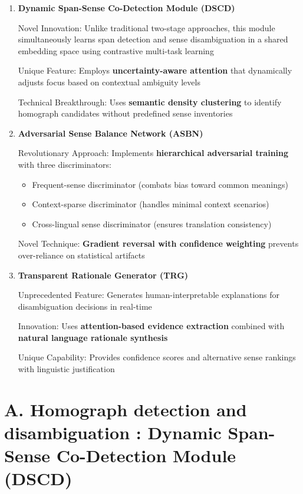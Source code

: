 \documentclass[a4paper,12pt]{article}
\begin{document}
\begin{enumerate}
    \item \textbf{Dynamic Span-Sense Co-Detection Module (DSCD)}
    
    Novel Innovation: Unlike traditional two-stage approaches, this module simultaneously learns span detection and sense disambiguation in a shared embedding space using contrastive multi-task learning

    Unique Feature: Employs \textbf{uncertainty-aware attention} that dynamically adjusts focus based on contextual ambiguity levels

    Technical Breakthrough: Uses \textbf{semantic density clustering} to identify homograph candidates without predefined sense inventories

    \item \textbf{Adversarial Sense Balance Network (ASBN)}

    Revolutionary Approach: Implements \textbf{hierarchical adversarial training} with three discriminators:

    \begin{itemize}
        \item Frequent-sense discriminator (combats bias toward common meanings)
        \item Context-sparse discriminator (handles minimal context scenarios)
        \item Cross-lingual sense discriminator (ensures translation consistency)
    \end{itemize}

    Novel Technique: \textbf{Gradient reversal with confidence weighting} prevents over-reliance on statistical artifacts

    \item \textbf{Transparent Rationale Generator (TRG)}

    Unprecedented Feature: Generates human-interpretable explanations for disambiguation decisions in real-time

    Innovation: Uses \textbf{attention-based evidence extraction} combined with \textbf{natural language rationale synthesis}

    Unique Capability: Provides confidence scores and alternative sense rankings with linguistic justification
\end{enumerate}

\bigskip

\section*{A. Homograph detection and disambiguation : Dynamic Span-Sense Co-Detection Module (DSCD)}
\end{document}
